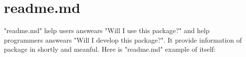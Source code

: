 \section{readme.md}

\begin{crules}
\end{crules}


"readme.md" help users answears "Will I use this package?" and help
programmers answears "Will I develop this package?". It provide information
of package in shortly and meanful. Here is "readme.md" example
of \pkgname{} itself:

